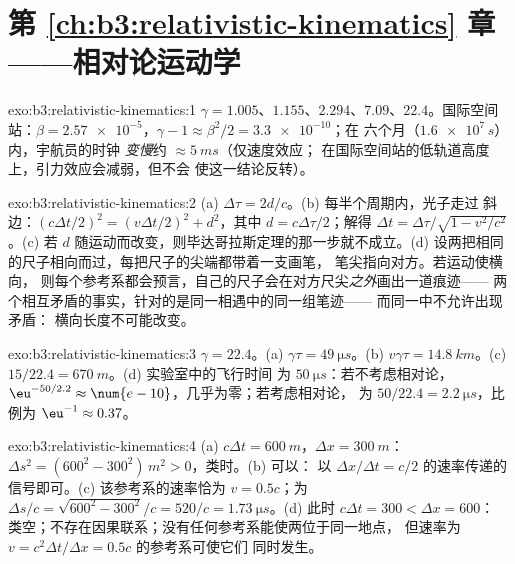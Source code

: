 \section*{第 \ref{ch:b3:relativistic-kinematics} 章——相对论运动学}

\begin{solution}{exo:b3:relativistic-kinematics:1}
$\gamma = 1.005$、$1.155$、$2.294$、$7.09$、$22.4$。国际空间站：$\beta =
\num{2.57e-5}$，$\gamma - 1 \approx \beta^2/2 = \num{3.3e-10}$；在
六个月（$\num{1.6e7}{}\,\unit{s}$）内，宇航员的时钟
\emph{变慢}约 $\approx\qty{5}{ms}$（仅速度效应；
在国际空间站的低轨道高度上，引力效应会减弱，但不会
使这一结论反转）。
\end{solution}

\begin{solution}{exo:b3:relativistic-kinematics:2}
(a) $\Delta\tau = 2d/c$。(b) 每半个周期内，光子走过
斜边：$(c\Delta t/2)^2 = (v\Delta t/2)^2 + d^2$，其中 $d =
c\Delta\tau/2$；解得 $\Delta t = \Delta\tau/\sqrt{1 - v^2/c^2}$。(c)
若 $d$ 随运动而改变，则毕达哥拉斯定理的那一步就不成立。(d)
设两把相同的尺子相向而过，每把尺子的尖端都带着一支画笔，
笔尖指向对方。若运动使横向，
则每个参考系都会预言，自己的尺子会在对方尺尖\emph{之外}画出一道痕迹——
两个相互矛盾的事实，针对的是同一相遇中的同一组笔迹——
而同一中不允许出现矛盾：
横向长度不可能改变。
\end{solution}

\begin{solution}{exo:b3:relativistic-kinematics:3}
$\gamma = 22.4$。(a) $\gamma\tau = \qty{49}{\micro s}$。(b) $v\gamma
\tau = \qty{14.8}{km}$。(c) $15/22.4 = \qty{670}{m}$。(d) 实验室中的飞行时间
为 $\qty{50}{\micro s}$：若不考虑相对论，
$\eu^{-50/2.2} \approx \num{e-10}$，几乎为零；若考虑相对论，
为 $50/22.4 = \qty{2.2}{\micro s}$，比例为 $\eu^{-1}
\approx 0.37$。
\end{solution}

\begin{solution}{exo:b3:relativistic-kinematics:4}
(a) $c\Delta t = \qty{600}{m}$，$\Delta x = \qty{300}{m}$：$\Delta s^2
= (600^2 - 300^2)\,\unit{m^2} > 0$，类时。(b) 可以：
以 $\Delta x/\Delta t = c/2$ 的速率传递的信号即可。(c) 该参考系的速率恰为 $v =
0.5c$；为 $\Delta s/c = \sqrt{600^2 - 300^2}/c = 520/c =
\qty{1.73}{\micro s}$。(d) 此时 $c\Delta t = 300 < \Delta x = 600$：
类空；不存在因果联系；没有任何参考系能使两位于同一地点，
但速率为 $v = c^2\Delta t/\Delta x = 0.5c$ 的参考系可使它们
同时发生。
\end{solution}

